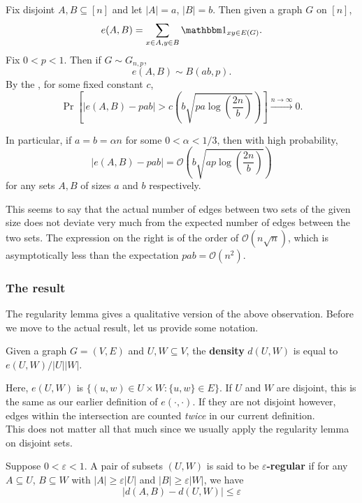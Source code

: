 			Fix disjoint $A, B \subseteq [n]$ and let $|A|=a$, $|B|=b$. Then given a graph $G$ on $[n]$,
			\[ e(A,B) = \sum_{x \in A, y \in B} \indic_{xy \in E(G)}. \]
			Fix $0<p<1$. Then if $G \sim G_{n,p}$,
			\[ e(A,B) \sim B\left( ab, p \right). \]
			By the , for some fixed constant $c$,
			\[ \Pr\left[ |e(A,B) - pab| > c \left(b\sqrt{pa\log\left(\frac{2n}{b}\right)}\right) \right] \xrightarrow{n\to\infty} 0. \]

			In particular, if $a = b = \alpha n$ for some $0 < \alpha < 1/3$, then with high probability,
			\[ |e(A,B) - pab| = \mathcal{O}\left(b\sqrt{ap\log\left(\frac{2n}{b}\right)}\right) \]
			for any sets $A, B$ of sizes $a$ and $b$ respectively.

			This seems to say that the actual number of edges between two sets of the given size does not deviate very much from the expected number of edges between the two sets. The expression on the right is of the order of $\mathcal{O}(n\sqrt{n})$, which is asymptotically less than the expectation $pab = \mathcal{O}(n^2)$.

		\subsubsection{The result}

			The regularity lemma gives a qualitative version of the above observation. Before we move to the actual result, let us provide some notation.

			\begin{fdef}[Density]
				Given a graph $G = (V,E)$ and $U,W \subseteq V$, the \textbf{density} $d(U,W)$ is equal to $e(U,W) / |U||W|$.
			\end{fdef}

			\begin{remark}
				Here, $e(U,W)$ is $\{(u,w) \in U \times W : \{u,w\} \in E\}$. If $U$ and $W$ are disjoint, this is the same as our earlier definition of $e(\cdot,\cdot)$. If they are not disjoint however, edges within the intersection are counted \emph{twice} in our current definition.\\
				This does not matter all that much since we usually apply the regularity lemma on disjoint sets.
			\end{remark}

			\begin{fdef}
				Suppose $0 < \varepsilon < 1$. A pair of subsets $(U,W)$ is said to be \textbf{$\varepsilon$-regular} if for any $A \subseteq U$, $B\subseteq W$ with $|A| \ge \varepsilon |U|$ and $|B| \ge \varepsilon |W|$, we have
				\[ |d(A,B) - d(U,W)| \le \varepsilon \]
			\end{fdef}


